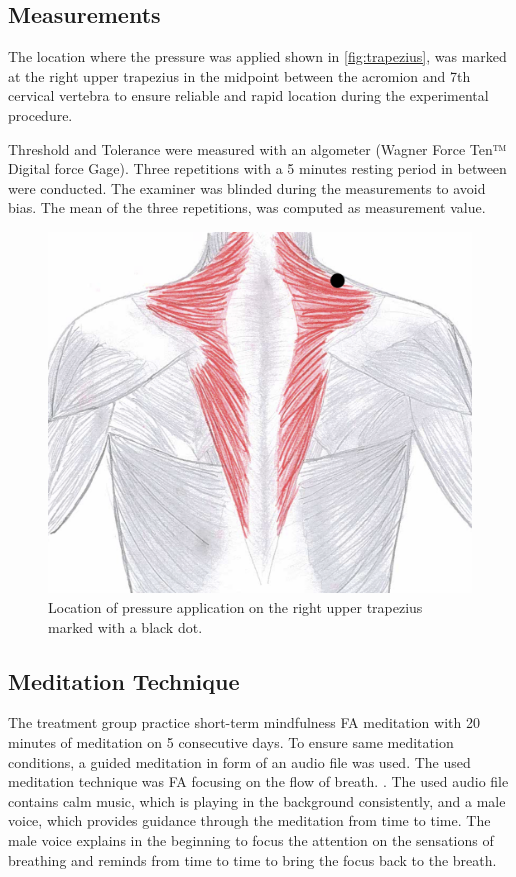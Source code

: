 \subsection{Measurements}%
The location where the pressure was applied shown in \autoref{fig:trapezius}, was marked at the right upper trapezius in the midpoint between the acromion and 7th cervical vertebra to ensure reliable and rapid location during the experimental procedure. 

Threshold and Tolerance were measured with an algometer (Wagner Force Ten™ Digital force Gage). Three repetitions with a 5 minutes resting period in between were conducted. The examiner was blinded during the measurements to avoid bias. The mean of the three repetitions, was computed as measurement value. 

\begin{figure}[H]
\centering
\includegraphics[width=.7\columnwidth]{../figures/trapezius}
\caption{Location of pressure application on the right upper trapezius marked with a black dot.}
\label{fig:trapezius}
\end{figure} \vspace{-.5cm}


\subsection{Meditation Technique}
The treatment group practice short-term mindfulness FA meditation with 20 minutes of meditation on 5 consecutive days. To ensure same meditation conditions, a guided meditation in form of an audio file was used. The used meditation technique was FA focusing on the flow of breath. . The used audio file contains calm music, which is playing in the background consistently, and a male voice, which provides guidance through the meditation from time to time.  The male voice explains in the beginning to focus the attention on the sensations of breathing and reminds from time to time to bring the focus back to the breath. 

